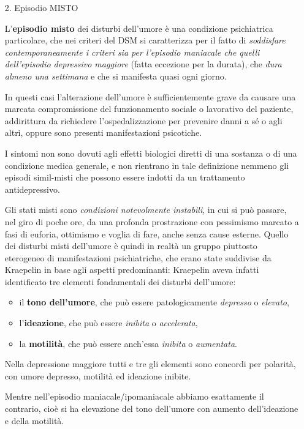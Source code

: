 \begin{itemize}
\item[2.]
Episodio MISTO

L'\textbf{episodio misto} dei disturbi dell'umore è una condizione
psichiatrica particolare, che nei criteri del DSM si caratterizza per il
fatto di \emph{soddisfare contemporaneamente i criteri sia per
l'episodio maniacale che quelli dell'episodio depressivo maggiore}
(fatta eccezione per la durata), che \emph{dura almeno una settimana} e
che si manifesta quasi ogni giorno.

In questi casi l'alterazione dell'umore è sufficientemente grave da
causare una marcata compromissione del funzionamento sociale o
lavorativo del paziente, addirittura da richiedere l'ospedalizzazione
per prevenire danni a sé o agli altri, oppure sono presenti
manifestazioni psicotiche.

I sintomi non sono dovuti agli effetti biologici diretti di una sostanza
o di una condizione medica generale, e non rientrano in tale definizione
nemmeno gli episodi simil-misti che possono essere indotti da un
trattamento antidepressivo.

Gli stati misti sono \emph{condizioni notevolmente instabili}, in cui si
può passare, nel giro di poche ore, da una profonda prostrazione con
pessimismo marcato a fasi di euforia, ottimismo e voglia di fare, anche
senza cause esterne. Quello dei disturbi misti dell'umore è quindi in
realtà un gruppo piuttosto eterogeneo di manifestazioni psichiatriche,
che erano state suddivise da Kraepelin in base agli aspetti
predominanti: Kraepelin aveva infatti identificato tre elementi
fondamentali dei disturbi dell'umore:

\begin{itemize}
\item
  il \textbf{tono dell'umore}, che può essere patologicamente
  \emph{depresso} o \emph{elevato},
\item
  l'\textbf{ideazione}, che può essere \emph{inibita} o
  \emph{accelerata},
\item
  la \textbf{motilità}, che può essere anch'essa \emph{inibita} o
  \emph{aumentata}.
\end{itemize}

Nella depressione maggiore tutti e tre gli elementi sono concordi per
polarità, con umore depresso, motilità ed ideazione inibite.

Mentre nell'episodio maniacale/ipomaniacale abbiamo esattamente il
contrario, cioè si ha elevazione del tono dell'umore con aumento
dell'ideazione e della motilità.


\end{itemize}
